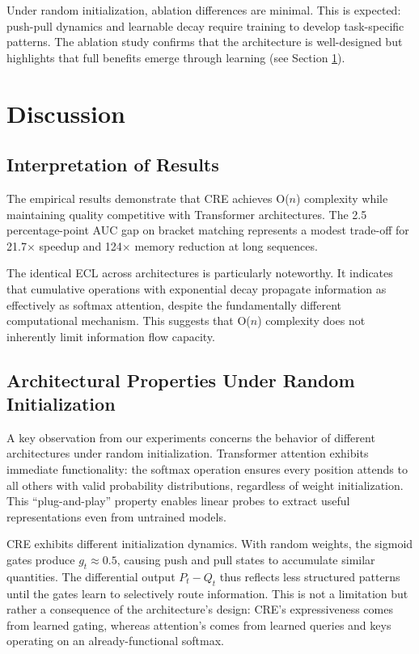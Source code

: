 \documentclass{article}
\begin{document}
Under random initialization, ablation differences are minimal. This is expected: push-pull dynamics and learnable decay require training to develop task-specific patterns. The ablation study confirms that the architecture is well-designed but highlights that full benefits emerge through learning (see Section \ref{sec:discussion}).

\section{Discussion}
\label{sec:discussion}

\subsection{Interpretation of Results}

The empirical results demonstrate that CRE achieves O($n$) complexity while maintaining quality competitive with Transformer architectures. The 2.5 percentage-point AUC gap on bracket matching represents a modest trade-off for 21.7$\times$ speedup and 124$\times$ memory reduction at long sequences.

The identical ECL across architectures is particularly noteworthy. It indicates that cumulative operations with exponential decay propagate information as effectively as softmax attention, despite the fundamentally different computational mechanism. This suggests that O($n$) complexity does not inherently limit information flow capacity.

\subsection{Architectural Properties Under Random Initialization}

A key observation from our experiments concerns the behavior of different architectures under random initialization. Transformer attention exhibits immediate functionality: the softmax operation ensures every position attends to all others with valid probability distributions, regardless of weight initialization. This ``plug-and-play'' property enables linear probes to extract useful representations even from untrained models.

CRE exhibits different initialization dynamics. With random weights, the sigmoid gates produce $g_t \approx 0.5$, causing push and pull states to accumulate similar quantities. The differential output $P_t - Q_t$ thus reflects less structured patterns until the gates learn to selectively route information. This is not a limitation but rather a consequence of the architecture's design: CRE's expressiveness comes from learned gating, whereas attention's comes from learned queries and keys operating on an already-functional softmax.
\end{document}
